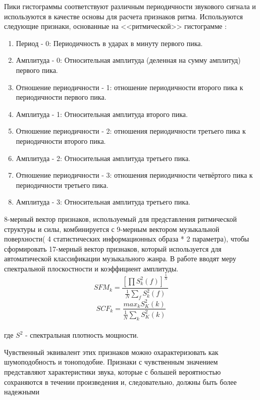 Пики гистограммы соответствуют различным периодичности звукового сигнала и используются в качестве основы для расчета признаков ритма. Используются следующие признаки, основанные на <<ритмической>> гистограмме :
\begin{enumerate}[label=\arabic*.]
\item Период - 0: Периодичность в ударах в минуту первого пика. 
\item Амплитуда - 0: Относительная амплитуда (деленная на сумму амплитуд) первого пика.
\item Отношение периодичности - 1: отношение периодичности второго пика к периодичности первого пика.
\item Амплитуда - 1: Относительная амплитуда второго пика.
\item Отношение периодичности - 2: отношения периодичности третьего пика к периодичности второго пика.
\item Амплитуда - 2: Относительная амплитуда третьего пика.
\item Отношение периодичности - 3: отношения периодичности четвёртого пика к периодичности третьего пика.
\item Амплитуда - 3: Относительная амплитуда третьего пика.
\end{enumerate}

8-мерный вектор признаков, используемый для представления ритмической структуры и силы, комбинируется с 9-мерным вектором музыкальной поверхности( 4 статистических информационных образа * 2 параметра), чтобы сформировать 17-мерный вектор признаков, который используется для автоматической классификации музыкального жанра.
В работе \cite{src2}  вводят меру спектральной плоскостности и коэффициент амплитуды.
\begin{equation}\label{eq:sfm}
SFM_k= \frac{[\prod S^2_k(f)]^{\frac{1}{N}} }{\frac{1}{N} \sum_f S^2_k(f)}	
\end{equation}
\begin{equation}\label{eq:scf}
SCF_k =  \frac{max_k S^2_K(k)}{\frac{1}{N} \sum_k S^2_K(k)}
\end{equation}\\
где $ S^2 $ - спектральная плотность мощности.

Чувственный эквивалент этих признаков можно охарактеризовать как шумоподобность и тоноподобие. Признаки с чувственным значением представляют характеристики звука, которые с большей вероятностью сохраняются в течении произведения и, следовательно, должны быть более надежными 

